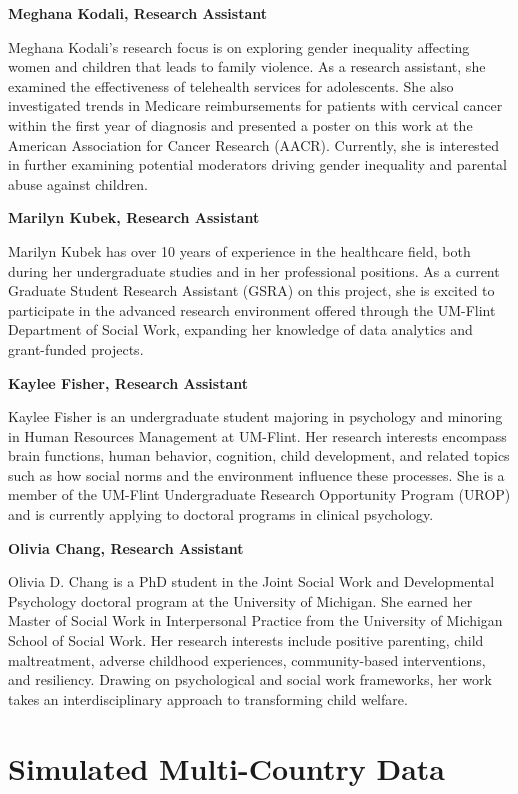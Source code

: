\documentclass[
  letterpaper,
  DIV=11,
  numbers=noendperiod]{scrreprt}
\begin{document}
\textbf{Meghana Kodali, Research Assistant}

Meghana Kodali's research focus is on exploring gender inequality
affecting women and children that leads to family violence. As a
research assistant, she examined the effectiveness of telehealth
services for adolescents. She also investigated trends in Medicare
reimbursements for patients with cervical cancer within the first year
of diagnosis and presented a poster on this work at the American
Association for Cancer Research (AACR). Currently, she is interested in
further examining potential moderators driving gender inequality and
parental abuse against children.

\textbf{Marilyn Kubek, Research Assistant}

Marilyn Kubek has over 10 years of experience in the healthcare field,
both during her undergraduate studies and in her professional positions.
As a current Graduate Student Research Assistant (GSRA) on this project,
she is excited to participate in the advanced research environment
offered through the UM-Flint Department of Social Work, expanding her
knowledge of data analytics and grant-funded projects.

\textbf{Kaylee Fisher, Research Assistant}

Kaylee Fisher is an undergraduate student majoring in psychology and
minoring in Human Resources Management at UM-Flint. Her research
interests encompass brain functions, human behavior, cognition, child
development, and related topics such as how social norms and the
environment influence these processes. She is a member of the UM-Flint
Undergraduate Research Opportunity Program (UROP) and is currently
applying to doctoral programs in clinical psychology.

\textbf{Olivia Chang, Research Assistant}

Olivia D. Chang is a PhD student in the Joint Social Work and
Developmental Psychology doctoral program at the University of Michigan.
She earned her Master of Social Work in Interpersonal Practice from the
University of Michigan School of Social Work. Her research interests
include positive parenting, child maltreatment, adverse childhood
experiences, community-based interventions, and resiliency. Drawing on
psychological and social work frameworks, her work takes an
interdisciplinary approach to transforming child welfare.


\hypertarget{simulated-multi-country-data}{%
\chapter{Simulated Multi-Country
Data}\label{simulated-multi-country-data}}
\end{document}
